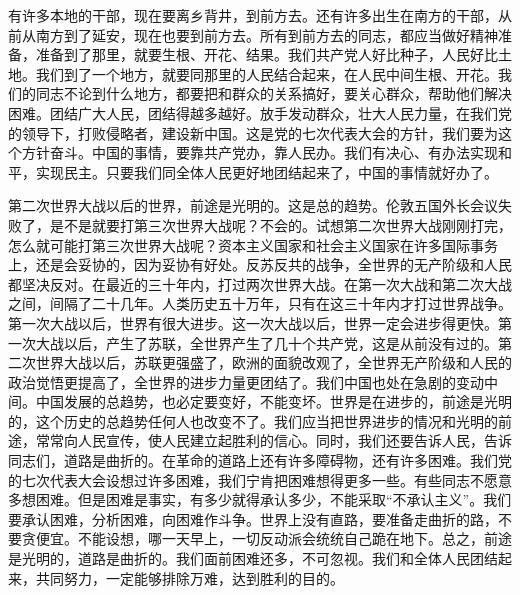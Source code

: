 有许多本地的干部，现在要离乡背井，到前方去。还有许多出生在南方的干部，从前从南方到了延安，现在也要到前方去。所有到前方去的同志，都应当做好精神准备，准备到了那里，就要生根、开花、结果。我们共产党人好比种子，人民好比土地。我们到了一个地方，就要同那里的人民结合起来，在人民中间生根、开花。我们的同志不论到什么地方，都要把和群众的关系搞好，要关心群众，帮助他们解决困难。团结广大人民，团结得越多越好。放手发动群众，壮大人民力量，在我们党的领导下，打败侵略者，建设新中国。这是党的七次代表大会的方针，我们要为这个方针奋斗。中国的事情，要靠共产党办，靠人民办。我们有决心、有办法实现和平，实现民主。只要我们同全体人民更好地团结起来了，中国的事情就好办了。

第二次世界大战以后的世界，前途是光明的。这是总的趋势。伦敦五国外长会议失败了，是不是就要打第三次世界大战呢？不会的。试想第二次世界大战刚刚打完，怎么就可能打第三次世界大战呢？资本主义国家和社会主义国家在许多国际事务上，还是会妥协的，因为妥协有好处。反苏反共的战争，全世界的无产阶级和人民都坚决反对。在最近的三十年内，打过两次世界大战。在第一次大战和第二次大战之间，间隔了二十几年。人类历史五十万年，只有在这三十年内才打过世界战争。第一次大战以后，世界有很大进步。这一次大战以后，世界一定会进步得更快。第一次大战以后，产生了苏联，全世界产生了几十个共产党，这是从前没有过的。第二次世界大战以后，苏联更强盛了，欧洲的面貌改观了，全世界无产阶级和人民的政治觉悟更提高了，全世界的进步力量更团结了。我们中国也处在急剧的变动中间。中国发展的总趋势，也必定要变好，不能变坏。世界是在进步的，前途是光明的，这个历史的总趋势任何人也改变不了。我们应当把世界进步的情况和光明的前途，常常向人民宣传，使人民建立起胜利的信心。同时，我们还要告诉人民，告诉同志们，道路是曲折的。在革命的道路上还有许多障碍物，还有许多困难。我们党的七次代表大会设想过许多困难，我们宁肯把困难想得更多一些。有些同志不愿意多想困难。但是困难是事实，有多少就得承认多少，不能采取“不承认主义”。我们要承认困难，分析困难，向困难作斗争。世界上没有直路，要准备走曲折的路，不要贪便宜。不能设想，哪一天早上，一切反动派会统统自己跪在地下。总之，前途是光明的，道路是曲折的。我们面前困难还多，不可忽视。我们和全体人民团结起来，共同努力，一定能够排除万难，达到胜利的目的。


